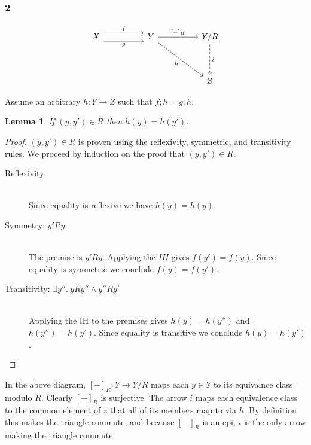 \documentclass{article}
\newtheorem{lemma}{Lemma}
\begin{document}
\subsubsection*{2}

\[\begin{tikzcd}
	X && Y && {Y/R} \\
	\\
	&&&& Z
	\arrow["i", dashed, from=1-5, to=3-5]
	\arrow["f", shift left=2, from=1-1, to=1-3]
	\arrow["{[-]_R}", from=1-3, to=1-5]
	\arrow["h"', from=1-3, to=3-5]
	\arrow["g"', shift right=2, from=1-1, to=1-3]
\end{tikzcd}\]

Assume an arbitrary $h : Y \to Z$ such that $f;h = g;h$. 

\begin{lemma}
If $(y,y') \in R$ then $h(y) = h(y')$.
\end{lemma}

\begin{proof}
$(y,y') \in R$ is proven using the reflexivity, symmetric, and transitivity rules. We proceed by induction on the proof that $(y,y') \in R$.

\begin{description}

\item[Reflexivity]~\\
Since equality is reflexive we have $h(y) = h(y)$.

\item[Symmetry: $y' R y$]~\\
The premise is $y' R y$. Applying the $IH$ gives $f(y') = f(y)$. Since equality is symmetric we conclude $f(y) = f(y')$.

\item[Transitivity: $\exists y''.~y R y'' \wedge y'' R y'$]~\\
Applying the IH to the premises gives $h(y) = h(y'')$ and $h(y'') = h(y')$. Since equality is transitive we conclude $h(y) = h(y')$.

\end{description}

\end{proof}

In the above diagram, $[-]_R : Y \to Y/R$ maps each $y \in Y$ to its equivalnce class modulo $R$. Clearly $[-]_R$ is surjective. The arrow $i$ maps each equivalence class to the common element of $z$ that all of its members map to via $h$. By definition this makes the triangle commute, and because $[-]_R$ is an epi, $i$ is the only arrow making the triangle commute.
\end{document}
